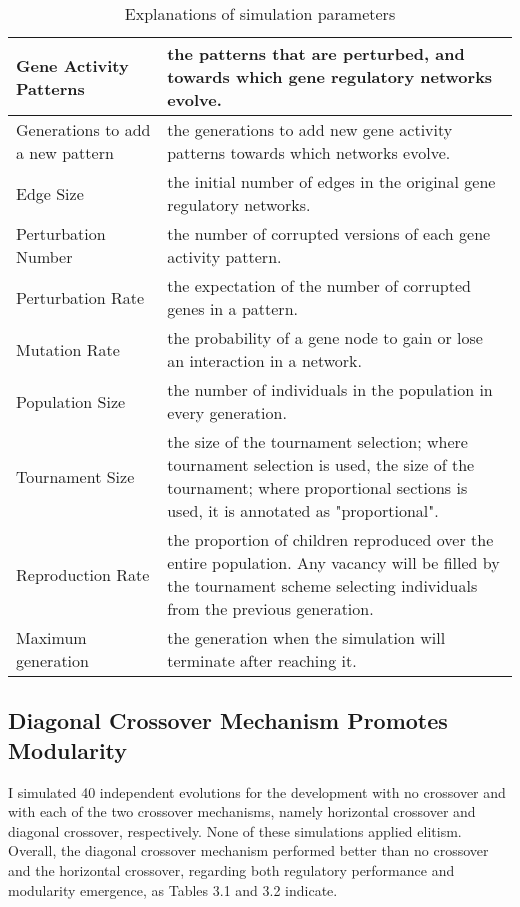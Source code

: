\begin{table}[!htbp]
	\centering
	\caption{Explanations of simulation parameters}
	\label{table:4.3}
	\begin{tabular}{|p{0.3\linewidth} | p{0.7\linewidth}|}
		\hline
		Gene Activity Patterns & the patterns that are perturbed, and towards which gene regulatory networks evolve. \\
		\hline
		Generations to add a new pattern & the generations to add new gene activity patterns towards which networks evolve. \\
		\hline
		Edge Size & the initial number of edges in the original gene regulatory networks. \\
		\hline
		Perturbation Number & the number of corrupted versions of each gene activity pattern. \\
		\hline
		Perturbation Rate & the expectation of the number of corrupted genes in a pattern. \\
		\hline
		Mutation Rate & the probability of a gene node to gain or lose an interaction in a network. \\
		\hline
		Population Size & the number of individuals in the population in every generation. \\
		\hline
		Tournament Size & the size of the tournament selection; where tournament selection is used, the size of the tournament; where proportional sections is used, it is annotated as "proportional". \\
		\hline
		Reproduction Rate & the proportion of children reproduced over the entire population. Any vacancy will be filled by the tournament scheme selecting individuals from the previous generation. \\
		\hline
		Maximum generation & the generation when the simulation will terminate after reaching it. \\
		\hline
	\end{tabular}
\end{table}

\subsection{Diagonal Crossover Mechanism Promotes Modularity}
I simulated 40 independent evolutions for the development with no crossover and with each of the two crossover mechanisms, namely horizontal crossover and diagonal crossover, respectively. None of these simulations applied elitism. Overall, the diagonal crossover mechanism performed better than no crossover and the horizontal crossover, regarding both regulatory performance and modularity emergence, as Tables 3.1 and 3.2 indicate.

